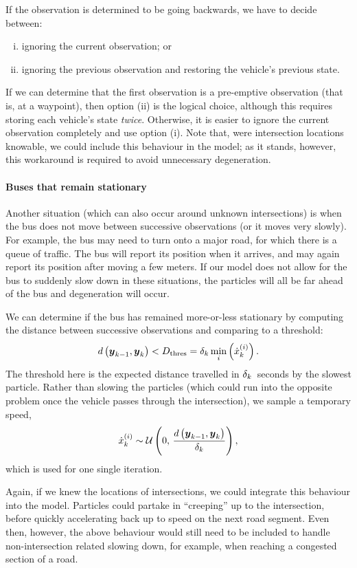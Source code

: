 If the observation is determined to be going backwards, we have to decide between:
\begin{enumerate}[i.]
\item ignoring the current observation; or
\item ignoring the previous observation and restoring the vehicle's previous state.
\end{enumerate}
If we can determine that the first observation is a pre-emptive observation (that is, at a waypoint), then option (ii) is the logical choice, although this requires storing each vehicle's state \emph{twice}. Otherwise, it is easier to ignore the current observation completely and use option (i). Note that, were intersection locations knowable, we could include this behaviour in the model; as it stands, however, this workaround is required to avoid unnecessary degeneration.


\paragraph{Buses that remain stationary}

Another situation (which can also occur around unknown intersections) is when the bus does not move between successive observations (or it moves very slowly). For example, the bus may need to turn onto a major road, for which there is a queue of traffic. The bus will report its position when it arrives, and may again report its position after moving a few meters. If our model does not allow for the bus to suddenly slow down in these situations, the particles will all be far ahead of the bus and degeneration will occur.


We can determine if the bus has remained more-or-less stationary by computing the distance between successive observations and comparing to a threshold:
\begin{equation}
\label{eq:vehicle_dist_check}
d\left(\boldsymbol{y}_{k-1}, \boldsymbol{y}_k\right) < D_\text{thres} =
\delta_k \min_i\left(\dot x_k^{(i)}\right).
\end{equation}
The threshold here is the expected distance travelled in $\delta_k$~seconds by the slowest particle. Rather than slowing the particles (which could run into the opposite problem once the vehicle passes through the intersection), we sample a temporary speed,
\begin{equation}
\label{eq:vehicle_temp_speed}
\dot x_k^{(i)} \sim
\mathcal{U}\left(0,\, \frac{d\left(\boldsymbol{y}_{k-1}, \boldsymbol{y}_k\right)}{\delta_k}\right),
\end{equation}
which is used for one single iteration.

Again, if we knew the locations of intersections, we could integrate this behaviour into the model. Particles could partake in ``creeping'' up to the intersection, before quickly accelerating back up to speed on the next road segment. Even then, however, the above behaviour would still need to be included to handle non-intersection related slowing down, for example, when reaching a congested section of a road.
